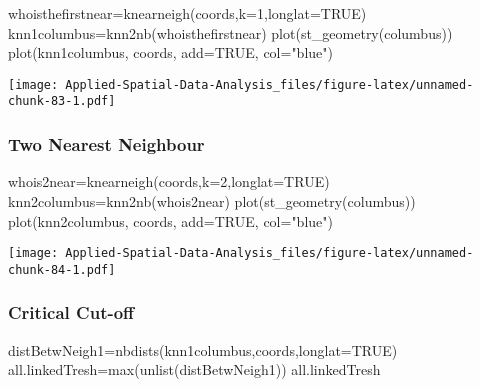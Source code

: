 \documentclass[
]{book}
\newenvironment{Shaded}{\begin{snugshade}}{\end{snugshade}}
\newcommand{\AttributeTok}[1]{\textcolor[rgb]{0.77,0.63,0.00}{#1}}
\newcommand{\ConstantTok}[1]{\textcolor[rgb]{0.00,0.00,0.00}{#1}}
\newcommand{\DecValTok}[1]{\textcolor[rgb]{0.00,0.00,0.81}{#1}}
\newcommand{\FunctionTok}[1]{\textcolor[rgb]{0.00,0.00,0.00}{#1}}
\newcommand{\NormalTok}[1]{#1}
\newcommand{\OtherTok}[1]{\textcolor[rgb]{0.56,0.35,0.01}{#1}}
\newcommand{\StringTok}[1]{\textcolor[rgb]{0.31,0.60,0.02}{#1}}
\begin{document}
\begin{Shaded}
\begin{Highlighting}[]
\NormalTok{whoisthefirstnear}\OtherTok{=}\FunctionTok{knearneigh}\NormalTok{(coords,}\AttributeTok{k=}\DecValTok{1}\NormalTok{,}\AttributeTok{longlat=}\ConstantTok{TRUE}\NormalTok{)}
\NormalTok{knn1columbus}\OtherTok{=}\FunctionTok{knn2nb}\NormalTok{(whoisthefirstnear)}
\FunctionTok{plot}\NormalTok{(}\FunctionTok{st\_geometry}\NormalTok{(columbus))}
\FunctionTok{plot}\NormalTok{(knn1columbus, coords, }\AttributeTok{add=}\ConstantTok{TRUE}\NormalTok{, }\AttributeTok{col=}\StringTok{"blue"}\NormalTok{)}
\end{Highlighting}
\end{Shaded}

\texttt{[image: Applied-Spatial-Data-Analysis\_files/figure-latex/unnamed-chunk-83-1.pdf]}

\hypertarget{two-nearest-neighbour}{%
\subsubsection{Two Nearest Neighbour}\label{two-nearest-neighbour}}

\begin{Shaded}
\begin{Highlighting}[]
\NormalTok{whois2near}\OtherTok{=}\FunctionTok{knearneigh}\NormalTok{(coords,}\AttributeTok{k=}\DecValTok{2}\NormalTok{,}\AttributeTok{longlat=}\ConstantTok{TRUE}\NormalTok{)}
\NormalTok{knn2columbus}\OtherTok{=}\FunctionTok{knn2nb}\NormalTok{(whois2near)}
\FunctionTok{plot}\NormalTok{(}\FunctionTok{st\_geometry}\NormalTok{(columbus))}
\FunctionTok{plot}\NormalTok{(knn2columbus, coords, }\AttributeTok{add=}\ConstantTok{TRUE}\NormalTok{, }\AttributeTok{col=}\StringTok{"blue"}\NormalTok{)}
\end{Highlighting}
\end{Shaded}

\texttt{[image: Applied-Spatial-Data-Analysis\_files/figure-latex/unnamed-chunk-84-1.pdf]}

\hypertarget{critical-cut-off}{%
\subsubsection{Critical Cut-off}\label{critical-cut-off}}

\begin{Shaded}
\begin{Highlighting}[]
\NormalTok{distBetwNeigh1}\OtherTok{=}\FunctionTok{nbdists}\NormalTok{(knn1columbus,coords,}\AttributeTok{longlat=}\ConstantTok{TRUE}\NormalTok{)}
\NormalTok{all.linkedTresh}\OtherTok{=}\FunctionTok{max}\NormalTok{(}\FunctionTok{unlist}\NormalTok{(distBetwNeigh1))}
\NormalTok{all.linkedTresh}
\end{Highlighting}
\end{Shaded}
\end{document}
